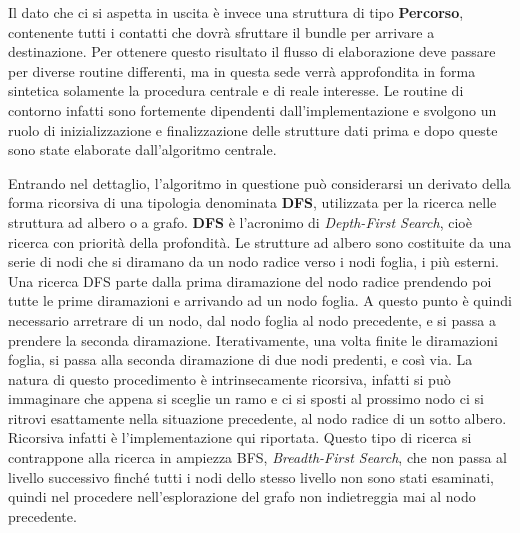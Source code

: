 \documentclass[12pt,a4paper,oneside]{book}
\begin{document}
		Il dato che ci si aspetta in uscita è invece una struttura di tipo {\bf Percorso}, contenente tutti i contatti che dovrà sfruttare il bundle per arrivare a destinazione. Per ottenere questo risultato il flusso di elaborazione deve passare per diverse routine differenti, ma in questa sede verrà approfondita in forma sintetica solamente la procedura centrale e di reale interesse. Le routine di contorno infatti sono fortemente dipendenti dall'implementazione e svolgono un ruolo di inizializzazione e finalizzazione delle strutture dati prima e dopo queste sono state elaborate dall'algoritmo centrale.
		
		Entrando nel dettaglio, l'algoritmo in questione può considerarsi un derivato della forma ricorsiva di una tipologia denominata {\bf DFS}, utilizzata per la ricerca nelle struttura ad albero o a grafo. {\bf DFS} è l'acronimo di {\it Depth-First Search}, cioè ricerca con priorità della profondità. Le strutture ad albero sono costituite da una serie di nodi che si diramano da un nodo radice verso i nodi foglia, i più esterni. Una ricerca DFS parte dalla prima diramazione del nodo radice prendendo poi tutte le prime diramazioni e arrivando ad un nodo foglia. A questo punto è quindi necessario arretrare di un nodo, dal nodo foglia al nodo precedente, e si passa a prendere la seconda diramazione. Iterativamente, una volta finite le diramazioni foglia, si passa alla seconda diramazione di due nodi predenti, e così via. La natura di questo procedimento è intrinsecamente ricorsiva, infatti si può immaginare che appena si sceglie un ramo e ci si sposti al prossimo nodo ci si ritrovi esattamente nella situazione precedente, al nodo radice di un sotto albero. Ricorsiva infatti è l'implementazione qui riportata. Questo tipo di ricerca si contrappone alla ricerca in ampiezza BFS, {\it Breadth-First Search}, che non passa al livello successivo finché tutti i nodi dello stesso livello non sono stati esaminati, quindi nel procedere nell'esplorazione del grafo non indietreggia mai al nodo precedente. 
		
\end{document}
